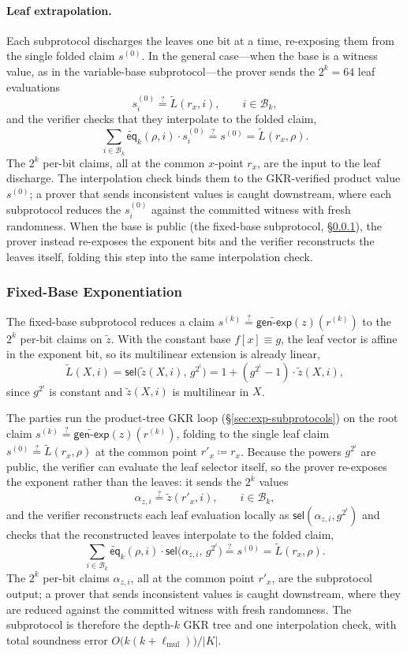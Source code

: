 \documentclass{article}
\theoremstyle{definition}
\newcommand*{\mle}{\widetilde}
\newcommand{\eq}{\mathsf{eq}}
\newcommand{\BB}{\mathcal{B}}
\newcommand{\sel}{\textsf{sel}}
\begin{document}
\paragraph{Leaf extrapolation.}
Each subprotocol discharges the leaves one bit at a time, re-exposing them from the single folded claim $s^{(0)}$. In the general case---when the base is a witness value, as in the variable-base subprotocol---the prover sends the $2^k = 64$ leaf evaluations
\[
  s^{(0)}_i \stackrel{?}{=} \mle{L}(r_x, i), \qquad i \in \BB_k,
\]
and the verifier checks that they interpolate to the folded claim,
\[
  \sum_{i \in \BB_k} \mle{\eq}_k(\rho, i) \cdot s^{(0)}_i \stackrel{?}{=} s^{(0)} = \mle{L}(r_x, \rho).
\]
The $2^k$ per-bit claims, all at the common $x$-point $r_x$, are the input to the leaf discharge. The interpolation check binds them to the GKR-verified product value $s^{(0)}$; a prover that sends inconsistent values is caught downstream, where each subprotocol reduces the $s^{(0)}_i$ against the committed witness with fresh randomness. When the base is public (the fixed-base subprotocol, \S\ref{sec:fixed-base-exp}), the prover instead re-exposes the exponent bits and the verifier reconstructs the leaves itself, folding this step into the same interpolation check.

\subsubsection{Fixed-Base Exponentiation}
\label{sec:fixed-base-exp}

The fixed-base subprotocol reduces a claim $s^{(k)} \stackrel{?}{=} \mle{\textsf{gen-exp}}(z)(r^{(k)})$ to the $2^k$ per-bit claims on $\mle{z}$. With the constant base $f[x] \equiv g$, the leaf vector is affine in the exponent bit, so its multilinear extension is already linear,
\[
  \mle{L}(X, i) = \sel\bigl( \mle{z}(X, i),\, g^{2^i} \bigr) = 1 + (g^{2^i} - 1) \cdot \mle{z}(X, i),
\]
since $g^{2^i}$ is constant and $\mle{z}(X, i)$ is multilinear in $X$.

The parties run the product-tree GKR loop (\S\ref{sec:exp-subprotocols}) on the root claim $s^{(k)} \stackrel{?}{=} \mle{\textsf{gen-exp}}(z)(r^{(k)})$, folding to the single leaf claim $s^{(0)} \stackrel{?}{=} \mle{L}(r_x, \rho)$ at the common point $r'_x \coloneqq r_x$. Because the powers $g^{2^i}$ are public, the verifier can evaluate the leaf selector itself, so the prover re-exposes the exponent rather than the leaves: it sends the $2^k$ values
\[
  \alpha_{z, i} \stackrel{?}{=} \mle{z}(r'_x, i), \qquad i \in \BB_k,
\]
and the verifier reconstructs each leaf evaluation locally as $\sel(\alpha_{z, i}, g^{2^i})$ and checks that the reconstructed leaves interpolate to the folded claim,
\[
  \sum_{i \in \BB_k} \mle{\eq}_k(\rho, i) \cdot \sel\bigl( \alpha_{z, i},\, g^{2^i} \bigr) \stackrel{?}{=} s^{(0)} = \mle{L}(r_x, \rho).
\]
The $2^k$ per-bit claims $\alpha_{z, i}$, all at the common point $r'_x$, are the subprotocol output; a prover that sends inconsistent values is caught downstream, where they are reduced against the committed witness with fresh randomness. The subprotocol is therefore the depth-$k$ GKR tree and one interpolation check, with total soundness error $O\bigl(k(k + \ell_\text{mul})\bigr) / |K|$.
\end{document}
